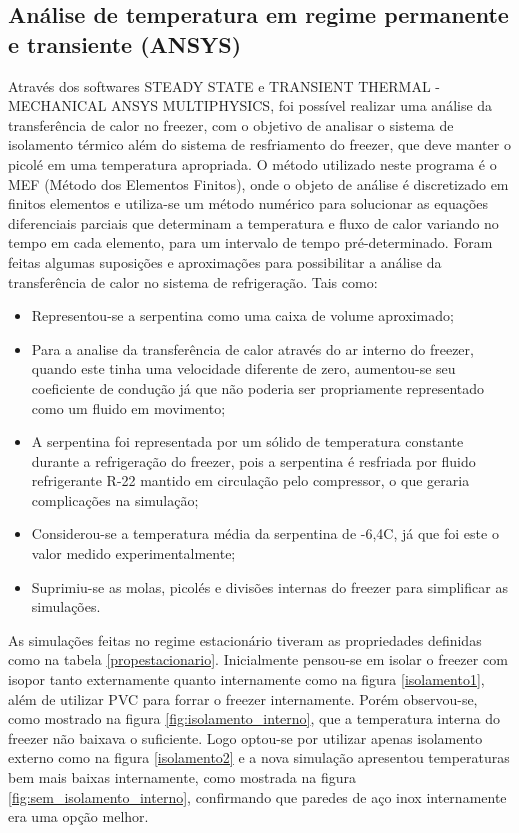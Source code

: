 \begin{itemize}

\subsection{Análise de temperatura em regime permanente e transiente (ANSYS)}

 Através dos softwares STEADY STATE e TRANSIENT THERMAL - MECHANICAL ANSYS MULTIPHYSICS, foi possível realizar uma análise da transferência de calor no freezer, com o objetivo de analisar o sistema de isolamento térmico além do sistema de resfriamento do freezer, que deve manter o picolé em uma temperatura apropriada. O método utilizado neste programa é o MEF (Método dos Elementos Finitos), onde o objeto de análise é discretizado em finitos elementos e utiliza-se um método numérico para solucionar as equações diferenciais parciais que determinam a temperatura e fluxo de calor variando no tempo em cada elemento, para um intervalo de tempo pré-determinado.
 Foram feitas algumas suposições e aproximações para possibilitar a análise da transferência de calor no sistema de refrigeração. Tais como:
\begin{itemize}
\item Representou-se a serpentina como uma caixa de volume aproximado;
\item Para a analise da transferência de calor através do ar interno do freezer, quando este tinha uma velocidade diferente de zero, aumentou-se seu coeficiente de condução já que não poderia ser propriamente representado como um fluido em movimento;
\item A serpentina foi representada por um sólido de temperatura constante durante a refrigeração do freezer, pois a serpentina é resfriada por fluido refrigerante R-22 mantido em circulação pelo compressor, o que geraria complicações na simulação;
\item Considerou-se a temperatura média da serpentina de -6,4\textdegree C, já que foi este o valor medido experimentalmente;
\item Suprimiu-se as molas, picolés e divisões internas do freezer para simplificar as simulações.
\end{itemize}
 As simulações feitas no regime estacionário tiveram as propriedades definidas como na tabela \ref{propestacionario}. Inicialmente pensou-se em isolar o freezer com isopor tanto externamente quanto internamente como na figura \ref{isolamento1}, além de utilizar PVC para forrar o freezer internamente. Porém observou-se, como mostrado na figura \ref{fig:isolamento_interno}, que a temperatura interna do freezer não baixava o suficiente. Logo optou-se por utilizar apenas isolamento externo como na figura \ref{isolamento2} e a nova simulação apresentou temperaturas bem mais baixas internamente, como mostrada na figura \ref{fig:sem_isolamento_interno}, confirmando que paredes de aço inox internamente era uma opção melhor. 
 

\end{itemize}
